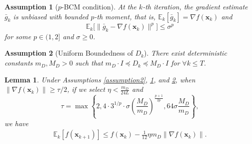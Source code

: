 \documentclass[10pt,a4paper]{amsart}
\newtheorem{assumption}{Assumption}
\newtheorem{lemma}{Lemma}
\newcommand{\barg}{\bar{g}}
\newcommand{\bx}{\boldsymbol{x}}
\begin{document}
\begin{assumption}[$p$-BCM condition]\label{assumption3}
At the $k$-th iteration, the gradient estimate $\barg_k$ is unbiased with bounded $p$-th moment, that is,
$\mathbb{E}_k[\barg_k ] = \nabla f(\bx_k)$ and
\begin{equation*}
\mathbb{E}_k \big[ \|\barg_k - \nabla f(\bx_k)\|^p \big] \leq \sigma^p
\end{equation*}
for some $p \in (1,2]$ and $\sigma \geq 0$.
\end{assumption}

\begin{assumption}[Uniform Boundedness of $D_k$]\label{assumption5}
    There exist deterministic constants $m_D,M_D>0$ such that $m_D\cdot I \preceq D_k \preceq M_D\cdot I$ for $\forall k \leq T$.
\end{assumption}

\begin{lemma}
    Under Assumptions \ref{assumption2}, \ref{assumption3}, and \ref{assumption5}, when $\|\nabla f(\bx_k)\|\geq \tau/2$, if we select $\eta<\frac{m_D}{24L }$ and 
    \begin{equation*}
        \tau = \max\left\{2,  4\cdot 3^{1/p}\cdot \sigma\left(\frac{M_D}{m_D}\right)^{\frac{p+1}{2p}}, 64 \sigma \frac{M_D}{m_D} \right\},
    \end{equation*}
    we have
    \begin{align*}
    \mathbb{E}_k[ f(\bx_{k+1}) ] \le f(\bx_k) - \frac{1}{12} \eta m_D \|\nabla f(\bx_k)\|.
\end{align*}
\end{lemma}
\end{document}
